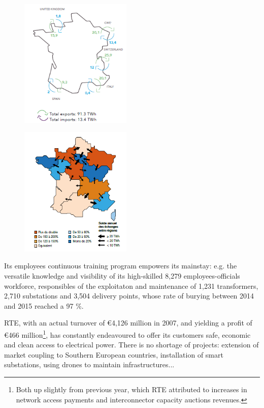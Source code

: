 \begin{figure}[ht]
    \centering
    \parbox[t]{0.475\textwidth}{
    \centering
    {\includegraphics[width=0.475\textwidth]{0.figuras/exports-imports.png}}
    \label{fig:Rte-portfolio}
    }
    \hfill
    \parbox[t]{0.475\textwidth}{
    \centering
    {\includegraphics[width=0.475\textwidth]{0.figuras/prod-consumption-national.png}}
    \label{fig:National-exchangues}
    }
\end{figure}



Its employees continuous training program empowers its mainstay: e.g. the versatile knowledge and visibility of its high-skilled 8,279 employees-officials workforce, responsibles of the exploitaton and maintenance of 1,231 transformers, 2,710 substations and 3,504 delivery points, whose rate of burying between 2014 and 2015 reached a 97 \%.

RTE, with an actual turnover of €4,126 million in 2007, and yielding a profit of €466 million\footnote{Both up slightly from previous year, which RTE attributed to increases in network access payments and interconnector capacity auctions revenues.}, has constantly endeavoured to offer its customers safe, economic and clean access to electrical power. There is no shortage of projects: extension of market coupling to Southern European countries, installation of smart substations, using drones to maintain infrastructures...

